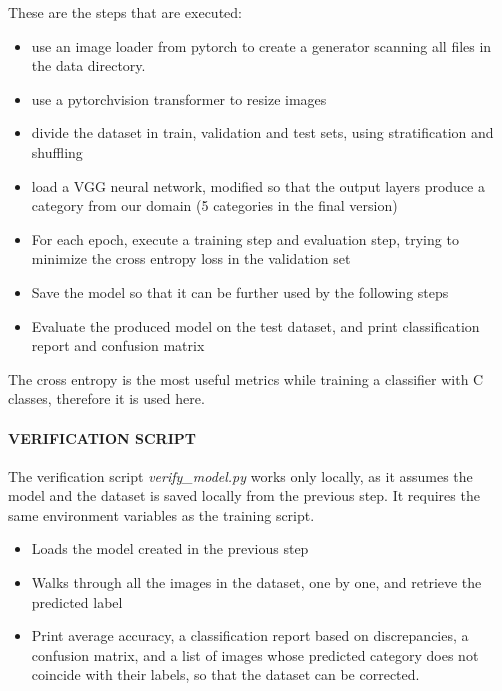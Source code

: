 \documentclass[
]{article}
\providecommand{\tightlist}{%
  \setlength{\itemsep}{0pt}\setlength{\parskip}{0pt}}
\begin{document}
These are the steps that are executed:

\begin{itemize}
\tightlist
\item
  use an image loader from pytorch to create a generator scanning all
  files in the data directory.
\item
  use a pytorchvision transformer to resize images
\item
  divide the dataset in train, validation and test sets, using
  stratification and shuffling
\item
  load a VGG neural network, modified so that the output layers produce
  a category from our domain (5 categories in the final version)
\item
  For each epoch, execute a training step and evaluation step, trying to
  minimize the cross entropy loss in the validation set
\item
  Save the model so that it can be further used by the following steps
\item
  Evaluate the produced model on the test dataset, and print
  classification report and confusion matrix
\end{itemize}

The cross entropy is the most useful metrics while training a classifier
with C classes, therefore it is used here.

\hypertarget{verification-script}{%
\paragraph{VERIFICATION SCRIPT}\label{verification-script}}

The verification script \emph{verify\_model.py} works only locally, as
it assumes the model and the dataset is saved locally from the previous
step. It requires the same environment variables as the training script.

\begin{itemize}
\tightlist
\item
  Loads the model created in the previous step
\item
  Walks through all the images in the dataset, one by one, and retrieve
  the predicted label
\item
  Print average accuracy, a classification report based on
  discrepancies, a confusion matrix, and a list of images whose
  predicted category does not coincide with their labels, so that the
  dataset can be corrected.
\end{itemize}
\end{document}

